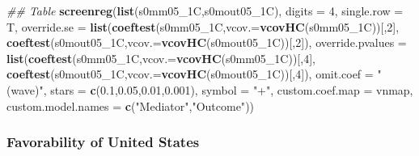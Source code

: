 \documentclass[
]{article}
\newenvironment{Shaded}{\begin{snugshade}}{\end{snugshade}}
\newcommand{\CommentTok}[1]{\textcolor[rgb]{0.56,0.35,0.01}{\textit{#1}}}
\newcommand{\DataTypeTok}[1]{\textcolor[rgb]{0.13,0.29,0.53}{#1}}
\newcommand{\DecValTok}[1]{\textcolor[rgb]{0.00,0.00,0.81}{#1}}
\newcommand{\FloatTok}[1]{\textcolor[rgb]{0.00,0.00,0.81}{#1}}
\newcommand{\KeywordTok}[1]{\textcolor[rgb]{0.13,0.29,0.53}{\textbf{#1}}}
\newcommand{\NormalTok}[1]{#1}
\newcommand{\StringTok}[1]{\textcolor[rgb]{0.31,0.60,0.02}{#1}}
\begin{document}
\begin{Shaded}
\begin{Highlighting}[]
\CommentTok{## Table}
\KeywordTok{screenreg}\NormalTok{(}\KeywordTok{list}\NormalTok{(s0mm05_1C,s0mout05_1C), }\DataTypeTok{digits =} \DecValTok{4}\NormalTok{, }\DataTypeTok{single.row =}\NormalTok{ T,}
          \DataTypeTok{override.se =} \KeywordTok{list}\NormalTok{(}\KeywordTok{coeftest}\NormalTok{(s0mm05_1C,}\DataTypeTok{vcov.=}\KeywordTok{vcovHC}\NormalTok{(s0mm05_1C))[,}\DecValTok{2}\NormalTok{],}
                             \KeywordTok{coeftest}\NormalTok{(s0mout05_1C,}\DataTypeTok{vcov.=}\KeywordTok{vcovHC}\NormalTok{(s0mout05_1C))[,}\DecValTok{2}\NormalTok{]),}
          \DataTypeTok{override.pvalues =} \KeywordTok{list}\NormalTok{(}\KeywordTok{coeftest}\NormalTok{(s0mm05_1C,}\DataTypeTok{vcov.=}\KeywordTok{vcovHC}\NormalTok{(s0mm05_1C))[,}\DecValTok{4}\NormalTok{],}
                                  \KeywordTok{coeftest}\NormalTok{(s0mout05_1C,}\DataTypeTok{vcov.=}\KeywordTok{vcovHC}\NormalTok{(s0mout05_1C))[,}\DecValTok{4}\NormalTok{]),}
          \DataTypeTok{omit.coef =} \StringTok{"(wave)"}\NormalTok{, }\DataTypeTok{stars =} \KeywordTok{c}\NormalTok{(}\FloatTok{0.1}\NormalTok{,}\FloatTok{0.05}\NormalTok{,}\FloatTok{0.01}\NormalTok{,}\FloatTok{0.001}\NormalTok{), }\DataTypeTok{symbol =} \StringTok{"+"}\NormalTok{,}
          \DataTypeTok{custom.coef.map =}\NormalTok{ vnmap, }
          \DataTypeTok{custom.model.names =} \KeywordTok{c}\NormalTok{(}\StringTok{"Mediator"}\NormalTok{,}\StringTok{"Outcome"}\NormalTok{))}
\end{Highlighting}
\end{Shaded}

\hypertarget{favorability-of-united-states}{%
\subsubsection{Favorability of United
States}\label{favorability-of-united-states}}
\end{document}
